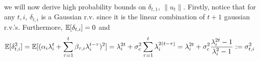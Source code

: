 \documentclass[10pt]{article}
\begin{document}

we will now derive high probability bounds on $\delta_{t,1}$, $\|u_t\|$. Firstly, notice that for any $t,i$, $\delta_{t,i}$ is a Gaussian r.v. since it is the linear combination of $t+1$ gaussian r.v.'s. Furthermore, $\mathbb{E}[\delta_{t,i}] = 0$ and 
\begin{align*}
\mathbb{E}[\delta_{t,i}^2] = \mathbb{E}[(\alpha_i \lambda_i^t + \sum_{\tau=1}^t \beta_{\tau,i} \lambda_i^{t-\tau})^2] = \lambda_i^{2t} + \sigma_c^2 \sum_{\tau=1}^t \lambda_i^{2(t-\tau)} = \lambda_i^{2t} + \sigma_c^2 \frac{\lambda_i^{2t}-1}{\lambda_i^2-1} := \sigma_{t,i}^2
\end{align*}
\end{document}
